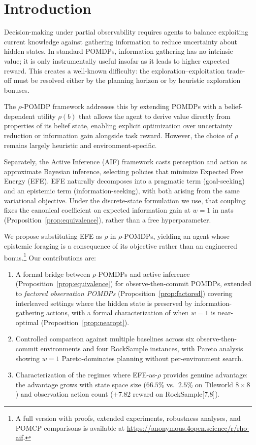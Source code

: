 \documentclass[runningheads]{llncs}
\begin{document}
\section{Introduction}

Decision-making under partial observability requires agents to balance exploiting current knowledge against gathering information to reduce uncertainty about hidden states. In standard POMDPs, information gathering has no intrinsic value; it is only instrumentally useful insofar as it leads to higher expected reward. This creates a well-known difficulty: the exploration--exploitation trade-off must be resolved either by the planning horizon or by heuristic exploration bonuses.

The $\rho$-POMDP framework \citep{araya2010} addresses this by extending POMDPs with a belief-dependent utility $\rho(b)$ that allows the agent to derive value directly from properties of its belief state, enabling explicit optimization over uncertainty reduction or information gain alongside task reward. However, the choice of $\rho$ remains largely heuristic and environment-specific.

Separately, the Active Inference (AIF) framework \citep{friston2010, parr2019} casts perception and action as approximate Bayesian inference, selecting policies that minimize Expected Free Energy (EFE). EFE naturally decomposes into a pragmatic term (goal-seeking) and an epistemic term (information-seeking), with both arising from the same variational objective. Under the discrete-state formulation we use, that coupling fixes the canonical coefficient on expected information gain at $w{=}1$ in nats (Proposition~\ref{prop:equivalence}), rather than a free hyperparameter.

We propose substituting EFE as $\rho$ in $\rho$-POMDPs, yielding an agent whose epistemic foraging is a consequence of its objective rather than an engineered bonus.\footnote{A full version with proofs, extended experiments, robustness analyses, and POMCP comparisons is available at \url{https://anonymous.4open.science/r/rho-aif}.} Our contributions are:
\begin{enumerate}
    \item A formal bridge between $\rho$-POMDPs and active inference (Proposition~\ref{prop:equivalence}) for observe-then-commit POMDPs, extended to \emph{factored observation POMDPs} (Proposition~\ref{prop:factored}) covering interleaved settings where the hidden state is preserved by information-gathering actions, with a formal characterization of when $w{=}1$ is near-optimal (Proposition~\ref{prop:nearopt}).
    \item Controlled comparison against multiple baselines across six observe-then-commit environments and four RockSample instances, with Pareto analysis showing $w{=}1$ Pareto-dominates planning without per-environment search.
    \item Characterization of the regimes where EFE-as-$\rho$ provides genuine advantage: the advantage grows with state space size ($66.5\%$ vs.\ $2.5\%$ on Tileworld $8{\times}8$) and observation action count ($+7.82$ reward on RockSample[7,8]).
\end{enumerate}
\end{document}
